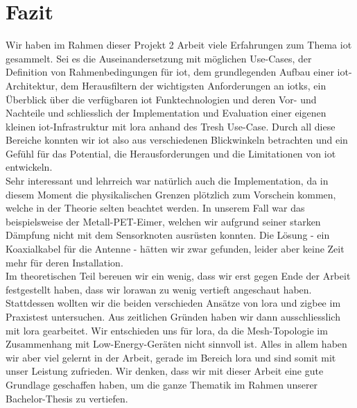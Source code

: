 \chapter{Fazit}

Wir haben im Rahmen dieser Projekt 2 Arbeit viele Erfahrungen zum Thema \gls{iot} gesammelt. Sei es die Auseinandersetzung mit möglichen Use-Cases, der Definition von Rahmenbedingungen für \gls{iot}, dem grundlegenden Aufbau einer \gls{iot}-Architektur, dem Herausfiltern der wichtigsten Anforderungen an \glspl{iotk}, ein Überblick über die verfügbaren \gls{iot} Funktechnologien und deren Vor- und Nachteile und schliesslich der Implementation und Evaluation einer eigenen kleinen \gls{iot}-Infrastruktur mit \gls{lora} anhand des Tresh Use-Case. Durch all diese Bereiche konnten wir \gls{iot} also aus verschiedenen Blickwinkeln betrachten und ein Gefühl für das Potential, die Herausforderungen und die Limitationen von \gls{iot} entwickeln.\\
Sehr interessant und lehrreich war natürlich auch die Implementation, da in diesem Moment die physikalischen Grenzen plötzlich zum Vorschein kommen, welche in der Theorie selten beachtet werden. In unserem Fall war das beispielsweise der Metall-PET-Eimer, welchen wir aufgrund seiner starken Dämpfung nicht mit dem Sensorknoten ausrüsten konnten. Die Lösung - ein Koaxialkabel für die Antenne - hätten wir zwar gefunden, leider aber keine Zeit mehr für deren Installation.\\
Im theoretischen Teil bereuen wir ein wenig, dass wir erst gegen Ende der Arbeit festgestellt haben, dass wir \gls{lorawan} zu wenig vertieft angeschaut haben. Stattdessen wollten wir die beiden verschieden Ansätze von \gls{lora} und \gls{zigbee} im Praxistest untersuchen. Aus zeitlichen Gründen haben wir dann ausschliesslich mit \gls{lora} gearbeitet. Wir entschieden uns für \gls{lora}, da die Mesh-Topologie im Zusammenhang mit Low-Energy-Geräten nicht sinnvoll ist.
Alles in allem haben  wir aber viel gelernt in der Arbeit, gerade im Bereich \gls{lora} und sind somit mit unser Leistung zufrieden. Wir denken, dass wir mit dieser Arbeit eine gute Grundlage geschaffen haben, um die ganze Thematik im Rahmen unserer Bachelor-Thesis zu vertiefen.
